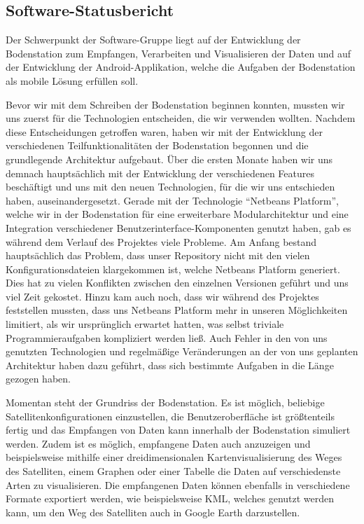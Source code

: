 \subsection{Software-Statusbericht}
Der Schwerpunkt der Software-Gruppe liegt auf der Entwicklung der Bodenstation zum Empfangen, Verarbeiten und Visualisieren der Daten und auf der Entwicklung der Android-Applikation, welche die Aufgaben der Bodenstation als mobile Lösung erfüllen soll.

Bevor wir mit dem Schreiben der Bodenstation beginnen konnten, mussten wir uns zuerst für die Technologien entscheiden, die wir verwenden wollten. Nachdem diese Entscheidungen getroffen waren, haben wir mit der Entwicklung der verschiedenen Teilfunktionalitäten der Bodenstation begonnen und die grundlegende Architektur aufgebaut. Über die ersten Monate haben wir uns demnach hauptsächlich mit der Entwicklung der verschiedenen Features beschäftigt und uns mit den neuen Technologien, für die wir uns entschieden haben, auseinandergesetzt. Gerade mit der Technologie ``Netbeans Platform'', welche wir in der Bodenstation für eine erweiterbare Modularchitektur und eine Integration verschiedener Benutzerinterface-Komponenten genutzt haben, gab es während dem Verlauf des Projektes viele Probleme. Am Anfang bestand hauptsächlich das Problem, dass unser Repository nicht mit den vielen Konfigurationsdateien klargekommen ist, welche Netbeans Platform generiert. Dies hat zu vielen Konflikten zwischen den einzelnen Versionen geführt und uns viel Zeit gekostet. Hinzu kam auch noch, dass wir während des Projektes feststellen mussten, dass uns Netbeans Platform mehr in unseren Möglichkeiten limitiert, als wir ursprünglich erwartet hatten, was selbst triviale Programmieraufgaben kompliziert werden ließ. Auch Fehler in den von uns genutzten Technologien und regelmäßige Veränderungen an der von uns geplanten Architektur haben dazu geführt, dass sich bestimmte Aufgaben in die Länge gezogen haben.

Momentan steht der Grundriss der Bodenstation. Es ist möglich, beliebige Satellitenkonfigurationen einzustellen, die Benutzeroberfläche ist größtenteils fertig und das Empfangen von Daten kann innerhalb der Bodenstation simuliert werden. Zudem ist es möglich, empfangene Daten auch anzuzeigen und beispielsweise mithilfe einer dreidimensionalen Kartenvisualisierung des Weges des Satelliten, einem Graphen oder einer Tabelle die Daten auf verschiedenste Arten zu visualisieren. Die empfangenen Daten können ebenfalls in verschiedene Formate exportiert werden, wie beispielsweise KML, welches genutzt werden kann, um den Weg des Satelliten auch in Google Earth darzustellen.

